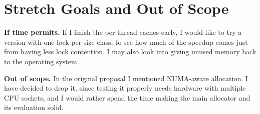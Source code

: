 \documentclass[12pt,letterpaper]{article}
\begin{document}
\section*{Stretch Goals and Out of Scope}

\textbf{If time permits.} If I finish the per-thread caches early, I would like to try a version with one lock per size class, to see how much of the speedup comes just from having less lock contention. I may also look into giving unused memory back to the operating system.

\textbf{Out of scope.} In the original proposal I mentioned NUMA-aware allocation. I have decided to drop it, since testing it properly needs hardware with multiple CPU sockets, and I would rather spend the time making the main allocator and its evaluation solid.
\end{document}
